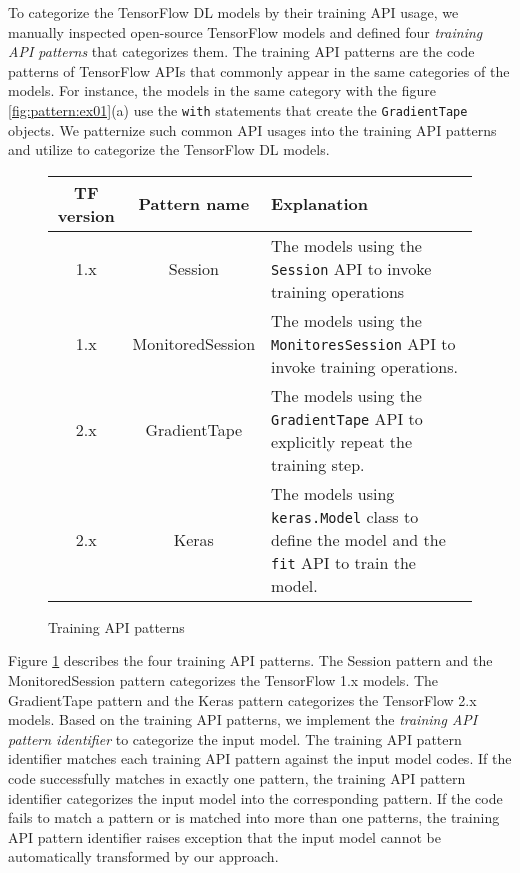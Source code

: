 To categorize the TensorFlow DL models by their training API usage,
we manually inspected open-source TensorFlow models and
defined four \textit{training API patterns} that categorizes them.
The training API patterns are the code patterns of TensorFlow APIs 
that commonly appear in the same categories of the models.
For instance, the models in the same category with the figure
\ref{fig:pattern:ex01}(a) use the {\tt with} statements that create the
{\tt GradientTape} objects.
We patternize such common API usages into the training API patterns and
utilize to categorize the TensorFlow DL models.

\begin{figure}[ht!]
  \centering
  \begin{tabular}{|c|c|l|}
    \hline
    TF version & Pattern name & Explanation \\
    \hline
    1.x & Session & 
	  The models using the {\tt Session} API to invoke training operations\\
    \hline
    1.x & MonitoredSession & 
	  The models using the {\tt MonitoresSession} API to invoke 
	  training operations.\\
    \hline
    2.x & GradientTape & 
	  The models using the {\tt GradientTape} API to explicitly 
	  repeat the training step.\\
    \hline
    2.x & Keras & 
	  The models using {\tt keras.Model} class to define the model
	  and the {\tt fit} API to train the model.\\
    \hline
  \end{tabular}
  \caption{Training API patterns}
  \label{tab:patterns}
\end{figure}

Figure \ref{tab:patterns} describes the four training API patterns.
The Session pattern and the MonitoredSession pattern categorizes the
TensorFlow 1.x models. The GradientTape pattern and the Keras pattern
categorizes the TensorFlow 2.x models.
Based on the training API patterns,
we implement the \textit{training API pattern identifier} to
categorize the input model.
The training API pattern identifier matches each training API pattern
against the input model codes. 
If the code successfully matches in exactly one pattern,
the training API pattern identifier categorizes the input model into
the corresponding pattern.
If the code fails to match a pattern or is matched into more than one patterns,
the training API pattern identifier raises exception that the input model
cannot be automatically transformed by our approach.



